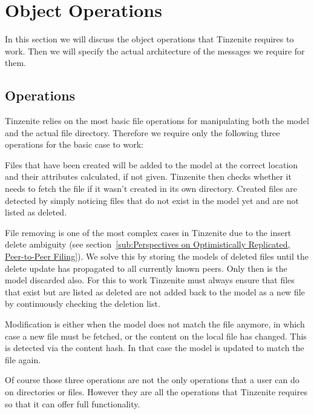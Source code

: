 \section{Object Operations}
\label{sec:Object Operations}

In this section we will discuss the object operations that Tinzenite requires to work.
Then we will specify the actual architecture of the messages we require for them.

\subsection{Operations}
\label{sub:Operations}

Tinzenite relies on the most basic file operations for manipulating both the model and the actual file directory.
Therefore we require only the following three operations for the basic case to work:

\begin{description}[leftmargin=5em,style=nextline,noitemsep,nolistsep]
    \item[Create]
        Files that have been created will be added to the model at the correct location and their attributes calculated, if not given.
        Tinzenite then checks whether it needs to fetch the file if it wasn't created in its own directory.
        Created files are detected by simply noticing files that do not exist in the model yet and are not listed as deleted.
    \item[Remove]
        File removing is one of the most complex cases in Tinzenite due to the insert delete ambiguity (see section~\ref{sub:Perspectives on Optimistically Replicated, Peer-to-Peer Filing}).
        We solve this by storing the models of deleted files until the delete update has propagated to all currently known peers.
        Only then is the model discarded also.
        For this to work Tinzenite must always ensure that files that exist but are listed as deleted are not added back to the model as a new file by continuously checking the deletion list.
    \item[Modify]
        Modification is either when the model does not match the file anymore, in which case a new file must be fetched, or the content on the local file has changed.
        This is detected via the content hash.
        In that case the model is updated to match the file again.
\end{description}

Of course those three operations are not the only operations that a user can do on directories or files.
However they are all the operations that Tinzenite requires so that it can offer full functionality.

